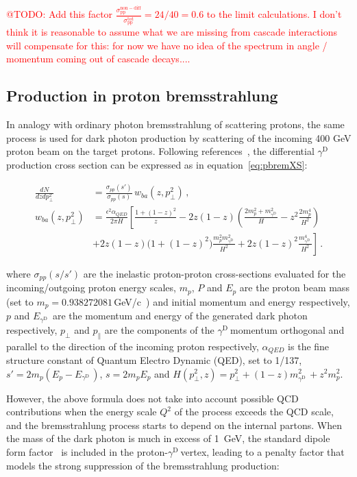 \documentclass[12pt,a4paper]{article}
\newcommand{\mathDP}{\gamma^{\mathrm{D}}\ }
\newcommand{\DP}{$\mathDP$}
\begin{document}
\textcolor{red}{@TODO: Add this factor
  $\frac{\sigma_{\mathrm{pp}}^{\mathrm{non-diff}}}{\sigma_{\mathrm{pp}}^{\mathrm{tot}}}
  = 24/40 = 0.6$ to the limit calculations. I don't think it is
  reasonable to assume what we are missing from cascade interactions
  will compensate for this: for now we have no idea of the spectrum in
  angle / momentum coming out of cascade decays....}

\subsection{Production in proton bremsstrahlung}
\label{sec:pbrem}

In analogy with ordinary photon bremsstrahlung of scattering protons,
the same process is used for dark photon production by scattering of
the incoming 400 GeV proton beam on the target protons. Following
references~\cite{Blumlein:2013cua, Gorbunov:2014wqa}, the differential
\DP production cross section can be expressed as in
equation~\ref{eq:pbremXS}:

\begin{align}
	\frac{d N}{dz dp_\perp^2} &= \frac{\sigma_{pp}(s')}{\sigma_{pp}(s)}\,
	w_{ba}(z,p_\perp^2)\,,\label{eq:pbremXS}\\
w_{ba}(z,p_\perp^2) &= \frac{\epsilon^2 \alpha_{QED}}{2\pi H}
\left[\frac{1+(1-z)^2}{z} -2z(1-z)\left(\frac{2m_p^2+m_{\mathDP}^2}{H}
-z^2\frac{2m_p^4}{H^2}\right) \right. \nonumber \\
&\left.+2z(1-z)\big(1+(1-z)^2\big)\frac{m_p^2m_{\mathDP}^2}{H^2}
+2z(1-z)^2\frac{m_{\mathDP}^4}{H^2} \right]\,.\nonumber
\end{align}

where $\sigma_{pp}(s/s')$ are the inelastic proton-proton
cross-sections evaluated for the incoming/outgoing proton energy
scales, $m_p$, $P$ and $E_p$ are the proton beam mass (set to $m_p =
0.938272081$\,GeV/c~\cite{Patrignani:2016xqp}) and initial momentum
and energy respectively, $p$ and $E_{\mathDP}$ are the momentum and
energy of the generated dark photon respectively, $p_\perp$ and
$p_\parallel$ are the components of the \DP momentum orthogonal and
parallel to the direction of the incoming proton respectively,
$\alpha_{QED}$ is the fine structure constant of Quantum
Electro Dynamic (QED), set to 1/137, $s'=2m_p(E_p-E_{\mathDP})$,
$s=2m_pE_p$ and
$H(p^2_\perp,z)=p_\perp^2+(1-z)m_{\mathDP}^2+z^2m_p^2$.

However, the above formula does not take into account possible QCD
contributions when the energy scale $Q^2$ of the process exceeds the
QCD scale, and the bremsstrahlung process starts to depend on the
internal partons. When the mass of the dark photon is much in excess
of 1~GeV, the standard dipole form
factor~\cite{RevModPhys.35.335} is included in the proton-\DP vertex,
leading to a penalty factor that models the strong suppression of the
bremsstrahlung production:
\end{document}
